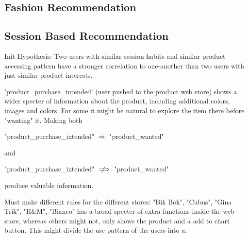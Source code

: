 \subsection{Fashion Recommendation}






\subsection{Session Based Recommendation}
Init Hypothesis:
Two users with similar session habits and similar product accessing pattern
have a stronger correlation to one-another than two users with just similar
product interests.


'product\_purchase\_intended' (user pushed to the product web store) shows a
wider specter of information about the product, including additional colors,
images and colors.  For some it might be natural to explore the item there
before "wanting" it. Making both

"product\_purchase\_intended" $\Rightarrow$ "product\_wanted"

and

"product\_purchase\_intended" $\notimplies$ "product\_wanted"

produce valuable information.

Must make different rules for the different stores:
"Bik Bok", "Cubus", "Gina Trik", "H\&M", "Bianco" has a broad specter of extra
functions inside the web store, whereas others might not, only shows the
product and a add to chart button.  This might divide the use pattern of the
users into a:

